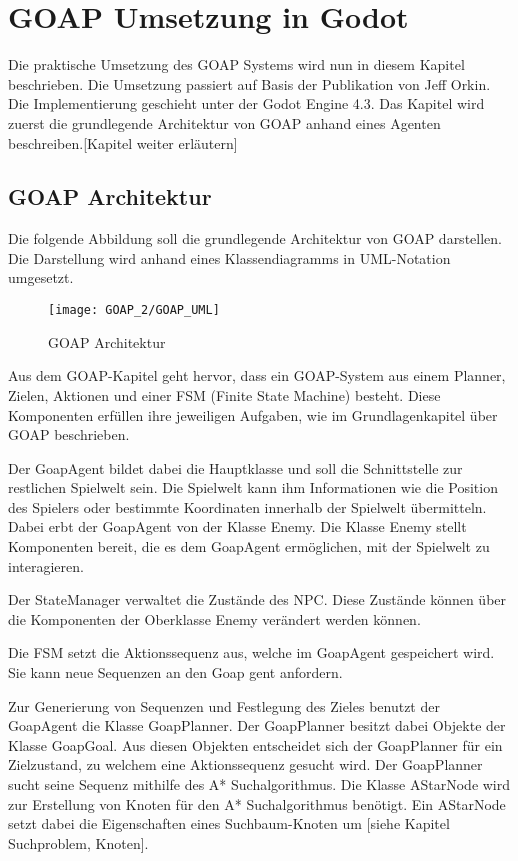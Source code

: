 \chapter{GOAP Umsetzung in Godot}

Die praktische Umsetzung des GOAP Systems wird nun in diesem Kapitel beschrieben. Die Umsetzung passiert auf Basis der Publikation von Jeff Orkin. Die Implementierung geschieht unter der Godot Engine 4.3. Das Kapitel wird zuerst die grundlegende Architektur von GOAP anhand eines Agenten beschreiben.[Kapitel weiter erläutern]

\section{GOAP Architektur}

Die folgende Abbildung soll die grundlegende Architektur von GOAP darstellen. Die Darstellung wird anhand eines Klassendiagramms in UML-Notation umgesetzt.

\begin{figure}[h]
  \centering
  \texttt{[image: GOAP\_2/GOAP\_UML]}
	\captionsetup{justification=justified, format=plain}
  \caption{GOAP Architektur}
  \label{GOAP Architektur eines Agenten}
\end{figure}

Aus dem GOAP-Kapitel geht hervor, dass ein GOAP-System aus einem Planner, Zielen, Aktionen und einer FSM (Finite State Machine) besteht. Diese Komponenten erfüllen ihre jeweiligen Aufgaben, wie im Grundlagenkapitel über GOAP beschrieben.

Der GoapAgent bildet dabei die Hauptklasse und soll die Schnittstelle zur restlichen Spielwelt sein. Die Spielwelt kann ihm Informationen wie die Position des Spielers oder bestimmte Koordinaten innerhalb der Spielwelt übermitteln. Dabei erbt der GoapAgent von der Klasse Enemy. Die Klasse Enemy stellt Komponenten bereit, die es dem GoapAgent ermöglichen, mit der Spielwelt zu interagieren.

Der StateManager verwaltet die Zustände des NPC. Diese Zustände können über die Komponenten der Oberklasse Enemy verändert werden können.

Die FSM setzt die Aktionssequenz aus, welche im GoapAgent gespeichert wird. Sie kann neue Sequenzen an den Goap gent anfordern.

Zur Generierung von Sequenzen und Festlegung des Zieles benutzt der GoapAgent die Klasse GoapPlanner. Der GoapPlanner besitzt dabei Objekte der Klasse GoapGoal. Aus diesen Objekten entscheidet sich der GoapPlanner für ein Zielzustand, zu welchem eine Aktionssequenz gesucht wird.
Der GoapPlanner sucht seine Sequenz mithilfe des A* Suchalgorithmus. Die Klasse AStarNode wird zur Erstellung von Knoten für den A* Suchalgorithmus benötigt. Ein AStarNode setzt dabei die Eigenschaften eines Suchbaum-Knoten um [siehe Kapitel Suchproblem, Knoten].

